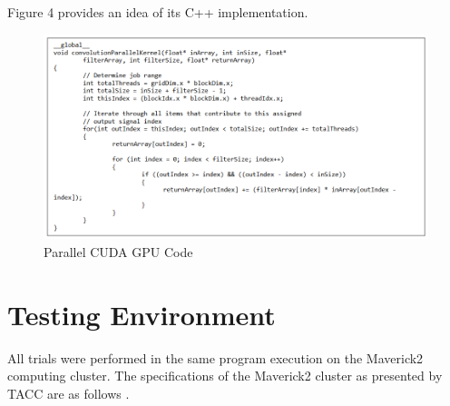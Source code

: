 \documentclass{article}
\begin{document}
Figure 4 provides an idea of its C++ implementation.

\begin{figure}[htp]
    \centering
    \includegraphics[width=\textwidth]{1048_4.png}
    \caption{Parallel CUDA GPU Code}
    \label{fig:parallel code}
\end{figure}

\section{Testing Environment}
All trials were performed in the same program execution on the Maverick2 computing cluster. The specifications of the Maverick2 cluster as presented by TACC are as follows .
\end{document}
